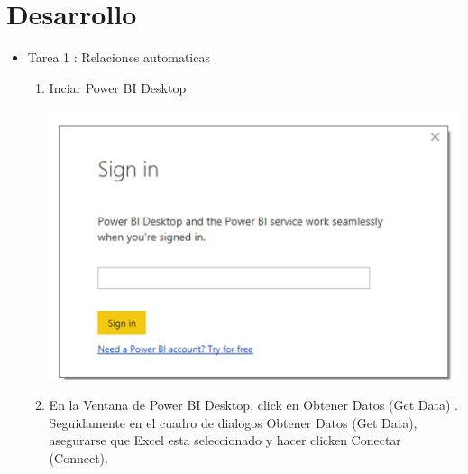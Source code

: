 \section{Desarrollo} 


\begin{itemize}
\item Tarea 1 : Relaciones automaticas


\begin{enumerate}
\item Inciar Power BI Desktop

\begin{center}
\includegraphics[scale=0.55]{./Imagenes/a1.png}
\end{center}

\item En la Ventana de Power BI Desktop, click en Obtener Datos (Get Data) . Seguidamente en el cuadro de dialogos Obtener Datos (Get Data), asegurarse que Excel esta seleccionado y hacer clicken Conectar (Connect).


\end{enumerate}
\end{itemize}
